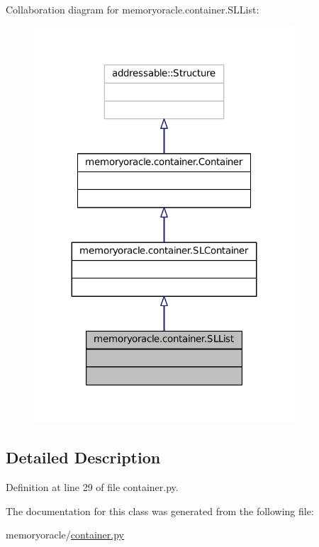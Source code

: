 Collaboration diagram for memoryoracle.\+container.\+S\+L\+List\+:\nopagebreak
\begin{figure}[H]
\begin{center}
\leavevmode
\includegraphics[width=275pt]{classmemoryoracle_1_1container_1_1SLList__coll__graph}
\end{center}
\end{figure}


\subsection{Detailed Description}


Definition at line 29 of file container.\+py.



The documentation for this class was generated from the following file\+:\begin{DoxyCompactItemize}
\item 
memoryoracle/\hyperlink{container_8py}{container.\+py}\end{DoxyCompactItemize}
